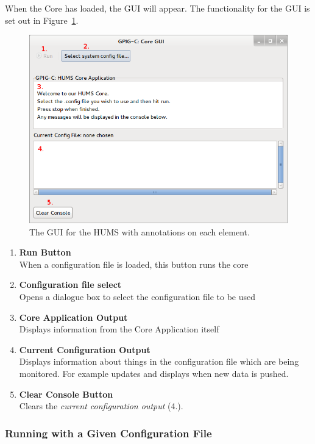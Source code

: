 \documentclass[10pt,a4paper]{article}
\begin{document}
When the Core has loaded, the GUI will appear. The functionality for the GUI is set out in Figure~\ref{fig:manualgui}.
\begin{figure}[H]
  \centering
  \includegraphics[width=\textwidth]{images/manual-gui.png}
  \caption{The GUI for the HUMS with annotations on each element.}
  \label{fig:manualgui}
\end{figure}
\begin{enumerate}
\item \textbf{Run Button} \\ 
When a configuration file is loaded, this button runs the core
\item \textbf{Configuration file select} \\ 
Opens a dialogue box to select the configuration file to be used
\item \textbf{Core Application Output} \\ 
Displays information from the Core Application itself
\item \textbf{Current Configuration Output} \\ 
Displays information about things in the configuration file which are being monitored. For example updates and displays when new data is pushed.
\item \textbf{Clear Console Button} \\ 
Clears the \emph{current configuration output} (4.).
\end{enumerate}

\subsubsection{Running with a Given Configuration File}
\label{subsec:loadconf}
\end{document}
